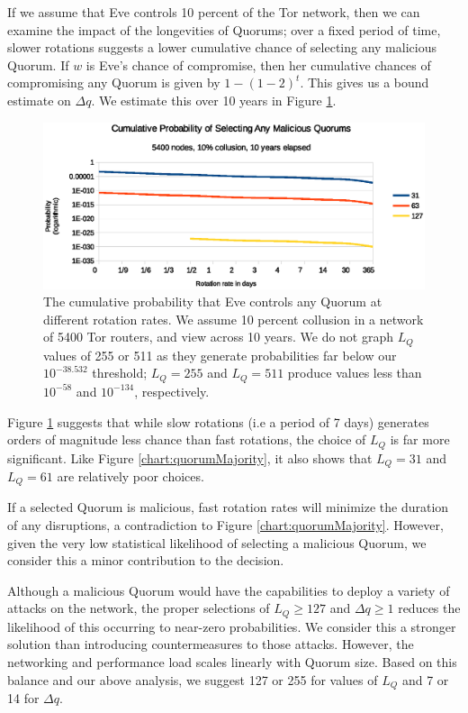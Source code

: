 If we assume that Eve controls 10 percent of the Tor network, then we can examine the impact of the longevities of Quorums; over a fixed period of time, slower rotations suggests a lower cumulative chance of selecting any malicious Quorum. If $ w $ is Eve's chance of compromise, then her cumulative chances of compromising any Quorum is given by $ 1 - (1-2)^t $. This gives us a bound estimate on $ \Delta q $. We estimate this over 10 years in Figure \ref{chart:cumulativeProbability}.

\begin{figure}[htbp]
	\centering
	\includegraphics[width=1\textwidth]{analysis/CumulativeMaliciousQuorum.eps}
	\caption{The cumulative probability that Eve controls any Quorum at different rotation rates. We assume 10 percent collusion in a network of 5400 Tor routers, and view across 10 years. We do not graph $ L_{Q} $ values of 255 or 511 as they generate probabilities far below our $ 10^{-38.532} $ threshold; $ L_{Q} = 255 $ and $ L_{Q} = 511 $ produce values less than $ 10^{-58} $ and $ 10^{-134} $, respectively.}
	\label{chart:cumulativeProbability}
\end{figure}

Figure \ref{chart:cumulativeProbability} suggests that while slow rotations (i.e a period of 7 days) generates orders of magnitude less chance than fast rotations, the choice of $ L_{Q} $ is far more significant. Like Figure \ref{chart:quorumMajority}, it also shows that $ L_{Q} = 31 $ and $ L_{Q} = 61 $ are relatively poor choices.

If a selected Quorum is malicious, fast rotation rates will minimize the duration of any disruptions, a contradiction to Figure \ref{chart:quorumMajority}. However, given the very low statistical likelihood of selecting a malicious Quorum, we consider this a minor contribution to the decision.

Although a malicious Quorum would have the capabilities to deploy a variety of attacks on the network, the proper selections of $ L_{Q} \geq 127 $ and $ \Delta q \geq 1 $ reduces the likelihood of this occurring to near-zero probabilities. We consider this a stronger solution than introducing countermeasures to those attacks. However, the networking and performance load scales linearly with Quorum size. Based on this balance and our above analysis, we suggest 127 or 255 for values of $ L_{Q} $ and 7 or 14 for $ \Delta q $.

